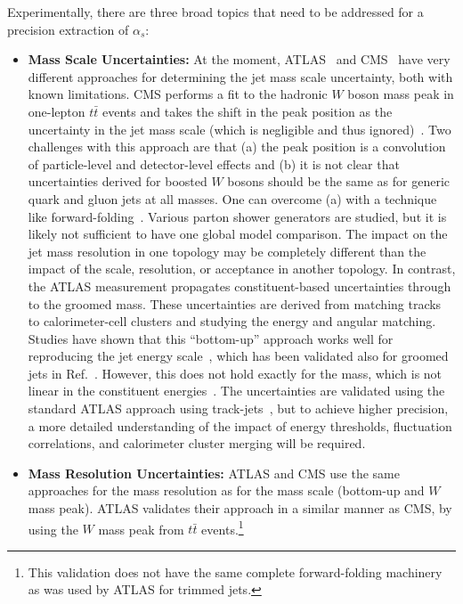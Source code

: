 \documentclass[11pt,letterpaper]{article}
\DeclareRobustCommand{\Ref}[1]{Ref.~\cite{#1}}
\begin{document}
Experimentally, there are three broad topics that need to be addressed for a precision extraction of $\alpha_s$:
%
\begin{itemize}
%
\item {\bf Mass Scale Uncertainties:} At the moment, ATLAS~\cite{Aaboud:2017qwh} and CMS~\cite{CMS-PAS-SMP-16-010} have very different approaches for determining the jet mass scale uncertainty, both with known limitations.
%
CMS performs a fit to the hadronic $W$ boson mass peak in one-lepton $t\bar{t}$ events and takes the shift in the peak position as the uncertainty in the jet mass scale (which is negligible and thus ignored)~\cite{Sirunyan:2016cao}.
%
Two challenges with this approach are that (a) the peak position is a convolution of particle-level and detector-level effects and (b) it is not clear that uncertainties derived for boosted $W$ bosons should be the same as for generic quark and gluon jets at all masses.
%
One can overcome (a) with a technique like forward-folding~\cite{ATLAS-CONF-2016-008,ATLAS-CONF-2016-035}.
%
Various parton shower generators are studied, but it is likely not sufficient to have one global model comparison.
%
The impact on the jet mass resolution in one topology may be completely different than the impact of the scale, resolution, or acceptance in another topology.
%
In contrast, the ATLAS measurement propagates constituent-based uncertainties through to the groomed mass.
%
These uncertainties are derived from matching tracks to calorimeter-cell clusters and studying the energy and angular matching.
%
Studies have shown that this ``bottom-up'' approach works well for reproducing the jet energy scale~\cite{Aaboud:2016hwh}, which has been validated also for groomed jets in \Ref{Aaboud:2017qwh}.
%
However, this does not hold exactly for the mass, which is not linear in the constituent energies~\cite{Nachman:2016qyc}.
%
The uncertainties are validated using the standard ATLAS approach using track-jets~\cite{Aad:2013gja,ATLAS-CONF-2017-063}, but to achieve higher precision, a more detailed understanding of the impact of energy thresholds, fluctuation correlations, and calorimeter cluster merging will be required.
%
\item {\bf Mass Resolution Uncertainties:} ATLAS and CMS use the same approaches for the mass resolution as for the mass scale (bottom-up and $W$ mass peak).
%
ATLAS validates their approach in a similar manner as CMS, by using the $W$ mass peak from $t\bar{t}$ events.\footnote{This validation does not have the same complete forward-folding machinery as was used by ATLAS for trimmed jets.}

\end{itemize}
\end{document}
